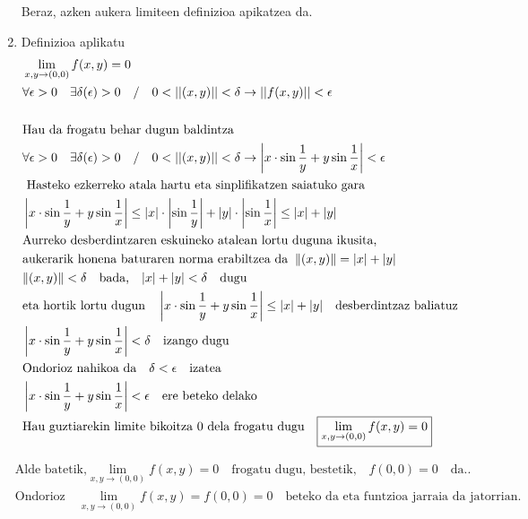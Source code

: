 \begin{enumerate}
    Beraz, azken aukera limiteen definizioa apikatzea da. 
    \item Definizioa aplikatu
    \begin{align*}
    &\lim_{x,y \to (0,0)}f(x,y)=0\\
    &\forall \epsilon >0 \quad \exists \delta(\epsilon)>0 \quad / \quad0<||(x,y)||<\delta \rightarrow ||f(x,y)||<\epsilon  \\
    \\
    &\text{Hau da frogatu behar dugun baldintza}\\
    &\forall \epsilon >0 \quad \exists \delta(\epsilon)>0 \quad / \quad0<||(x,y)||<\delta \rightarrow \left|x\cdot \sin \frac{1}{y}+ y \sin \frac{1}{x}\right|<\epsilon  \\
    &\text{ Hasteko ezkerreko atala hartu eta sinplifikatzen saiatuko gara}\\
    &\left|x\cdot \sin \frac{1}{y}+ y \sin \frac{1}{x}\right|\leq\left| x\right|\cdot\left |\sin\frac{1}{y}\right |+\left|y\right|\cdot\left|\sin\frac{1}{x}\right|\leq \abs{x}+\abs{y}\\
    &\text{Aurreko desberdintzaren eskuineko atalean lortu duguna ikusita,}\\
    &\text{aukerarik honena baturaren norma erabiltzea da} \;\; \| (x,y) \| =\abs{x}+\abs{y}\ \\
    &\| (x,y)\| < \delta \quad \text{bada,} \quad | x | + | y | < \delta \quad \text{dugu}\\
    &\text{eta hortik lortu dugun}\quad\left|x\cdot \sin \frac{1}{y}+ y \sin \frac{1}{x}\right|\leq \abs{x}+\abs{y}\quad \text{desberdintzaz baliatuz}\\
    &\left|x\cdot \sin \frac{1}{y}+ y \sin \frac{1}{x}\right|< \delta\quad \text{izango dugu}\\
    &\text{Ondorioz nahikoa da}\quad \delta < \epsilon \quad \text{izatea }\\
    &\left|x\cdot \sin \frac{1}{y}+ y \sin \frac{1}{x}\right| < \epsilon \quad \text{ere beteko delako}\\
    &\text{Hau guztiarekin limite bikoitza 0 dela frogatu dugu} \quad \boxed{\lim_{x,y \to (0,0)}f(x,y)=0}
    \end{align*}
\end{enumerate}

\begin{align*}
    &\text{Alde batetik,}\lim_{x,y \to (0,0)}f(x,y)=0\quad \text{frogatu dugu, bestetik,}\quad f(0,0)=0 \quad \text{da.}.\\ &\text{Ondorioz} \quad \boxed{\lim_{x,y \to (0,0)}f(x,y)=f(0,0)=0} \quad \text{beteko da eta funtzioa jarraia da jatorrian.}
\end{align*}










